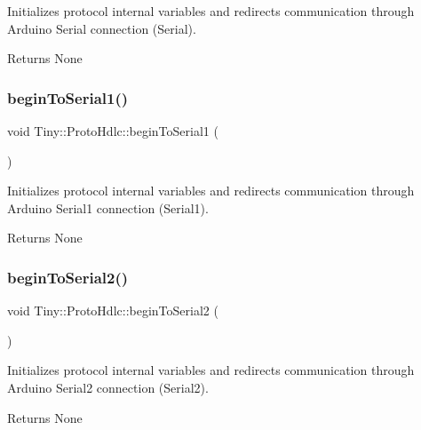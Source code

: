 Initializes protocol internal variables and redirects communication through Arduino Serial connection (Serial). \begin{DoxyReturn}{Returns}
None 
\end{DoxyReturn}
\mbox{\label{classTiny_1_1ProtoHdlc_aadaf2dbaad53bba682d37e0650585491}} 
\subsubsection{\texorpdfstring{begin\+To\+Serial1()}{beginToSerial1()}}
{\footnotesize\ttfamily void Tiny\+::\+Proto\+Hdlc\+::begin\+To\+Serial1 (\begin{DoxyParamCaption}{ }\end{DoxyParamCaption})\hspace{0.3cm}{\ttfamily [inline]}}

Initializes protocol internal variables and redirects communication through Arduino Serial1 connection (Serial1). \begin{DoxyReturn}{Returns}
None 
\end{DoxyReturn}
\mbox{\label{classTiny_1_1ProtoHdlc_aed9903c8e65495e0260b4095113ee641}} 
\subsubsection{\texorpdfstring{begin\+To\+Serial2()}{beginToSerial2()}}
{\footnotesize\ttfamily void Tiny\+::\+Proto\+Hdlc\+::begin\+To\+Serial2 (\begin{DoxyParamCaption}{ }\end{DoxyParamCaption})\hspace{0.3cm}{\ttfamily [inline]}}

Initializes protocol internal variables and redirects communication through Arduino Serial2 connection (Serial2). \begin{DoxyReturn}{Returns}
None 
\end{DoxyReturn}
\mbox{\label{classTiny_1_1ProtoHdlc_a1c895863c008b9dbd4316ae10c6e4ea0}} 
